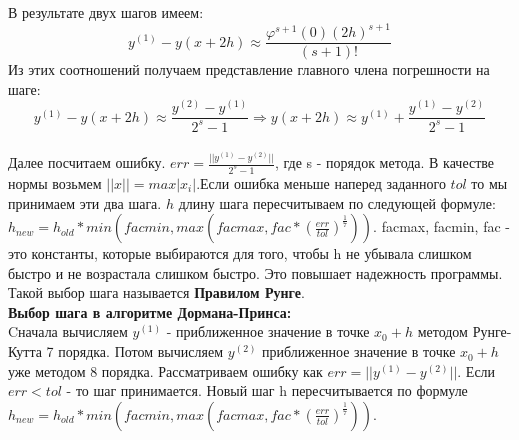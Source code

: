 \documentclass[12pt, a4paper] {article}
\theoremstyle{remark}
\theoremstyle{definition}
\begin{document}
В результате двух шагов имеем:
$$y^{(1)} - y(x + 2h) \approx \frac{\varphi^{s+1}(0) (2h)^{s+1}}{(s+1)!}$$
Из этих соотношений получаем представление главного члена погрешности на шаге:
$$y^{(1)} - y(x + 2h) \approx \frac{y^{(2)} - y^{(1)}}{2^s - 1} \Rightarrow y(x + 2h) \approx y^{(1)} + \frac{y^{(1)} - y^{(2)}}{2^s - 1}$$\\
Далее посчитаем ошибку. $ err = \frac{||y^{(1)} - y^{(2)}||}{2^s - 1}$, где s - порядок метода. В качестве нормы возьмем $ ||x|| = max|x_i|$.Если ошибка меньше наперед заданного $tol$ то мы принимаем эти два шага. $h$ длину шага пересчитываем по следующей формуле: $h_{new} =h_{old}*min(facmin, max(facmax, fac*(\frac{err}{tol})^\frac{1}{7}))$. facmax, facmin, fac - это константы, которые выбираются для того, чтобы h не убывала слишком быстро и не возрастала слишком быстро. Это повышает надежность программы. Такой выбор шага называется \textbf{Правилом Рунге}.\\
\textbf{Выбор шага в алгоритме Дормана-Принса:}\\
Cначала вычисляем $y^{(1)}$ - приближенное значение в точке $x_0 + h$ методом Рунге-Кутта 7 порядка. Потом вычисляем $y^{(2)}$ приближенное значение в точке $x_0 + h$ уже методом 8 порядка. Рассматриваем ошибку как $err = || y^{(1)} - y^{(2)}||$. Если $err < tol$ - то шаг принимается. Новый шаг h пересчитывается по формуле $h_{new} = h_{old}*min(facmin, max(facmax, fac*(\frac{err}{tol})^\frac{1}{7}))$.
\end{document}
